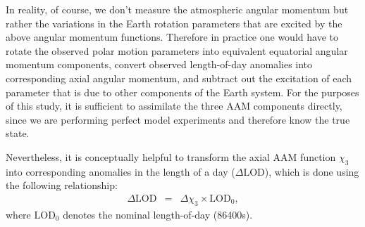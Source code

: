 In reality, of course, we don't measure the atmospheric angular momentum but rather the variations in the Earth rotation parameters that are excited by the above angular momentum functions.
Therefore in practice one would have to rotate the observed polar motion parameters into equivalent equatorial angular momentum components, convert observed length-of-day anomalies into corresponding axial angular momentum, and subtract out the excitation of each parameter that is due to other components of the Earth system.
For the purposes of this study, it is sufficient to assimilate the three AAM components directly, since we are performing perfect model experiments and therefore know the true state.

Nevertheless, it is conceptually helpful to transform the axial AAM function $\chi_3$ into corresponding anomalies in the length of a day ($\Delta$LOD), which is done using the following relationship:
\begin{eqnarray}
\Delta \text{LOD} &=& \Delta \chi_3 \times \text{LOD}_0 ,
\label{eq:X3_to_LOD}
\end{eqnarray}
where $\text{LOD}_0$ denotes the nominal length-of-day (86400s).  



